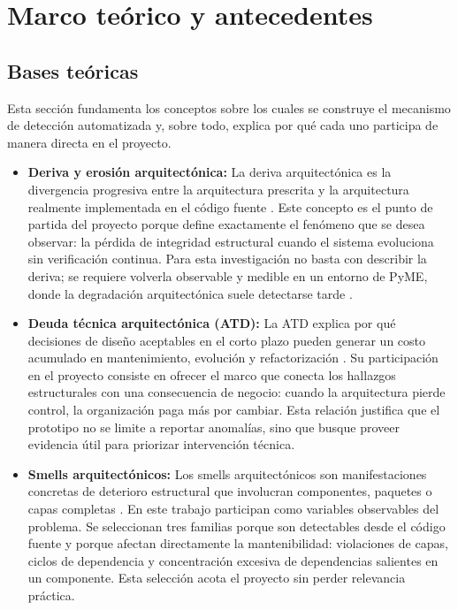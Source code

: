 \section{Marco teórico y antecedentes}

\subsection{Bases teóricas}
Esta sección fundamenta los conceptos sobre los cuales se construye el mecanismo de detección automatizada y, sobre todo, explica por qué cada uno participa de manera directa en el proyecto.
\begin{itemize}
    \item \textbf{Deriva y erosión arquitectónica:} La deriva arquitectónica es la divergencia progresiva entre la arquitectura prescrita y la arquitectura realmente implementada en el código fuente \parencite{Pigazzini2021}. Este concepto es el punto de partida del proyecto porque define exactamente el fenómeno que se desea observar: la pérdida de integridad estructural cuando el sistema evoluciona sin verificación continua. Para esta investigación no basta con describir la deriva; se requiere volverla observable y medible en un entorno de PyME, donde la degradación arquitectónica suele detectarse tarde \parencite{Anthony2024}.

    \item \textbf{Deuda técnica arquitectónica (ATD):} La ATD explica por qué decisiones de diseño aceptables en el corto plazo pueden generar un costo acumulado en mantenimiento, evolución y refactorización \parencite{Hamed2023, Pigazzini2021}. Su participación en el proyecto consiste en ofrecer el marco que conecta los hallazgos estructurales con una consecuencia de negocio: cuando la arquitectura pierde control, la organización paga más por cambiar. Esta relación justifica que el prototipo no se limite a reportar anomalías, sino que busque proveer evidencia útil para priorizar intervención técnica.

    \item \textbf{Smells arquitectónicos:} Los smells arquitectónicos son manifestaciones concretas de deterioro estructural que involucran componentes, paquetes o capas completas \parencite{SasAvgeriou, Pigazzini2021}. En este trabajo participan como variables observables del problema. Se seleccionan tres familias porque son detectables desde el código fuente y porque afectan directamente la mantenibilidad: violaciones de capas, ciclos de dependencia y concentración excesiva de dependencias salientes en un componente. Esta selección acota el proyecto sin perder relevancia práctica.


\end{itemize}
